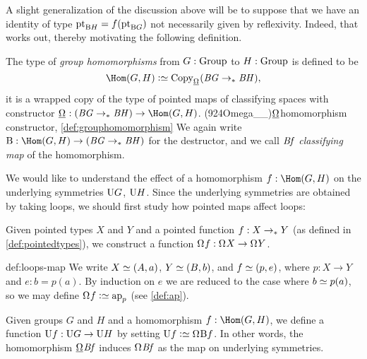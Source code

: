A slight generalization of the discussion above will be to suppose that we have an identity of type $\mathrm{pt}_{\mathrm{B} H} = f ( \mathrm{pt}_{\mathrm{B} G} ) $ not
necessarily given by reflexivity.  Indeed, that works out, thereby motivating the following definition.

\begin{definition}\label{def:grouphomomorphism}
  The type of \emph{group homomorphisms} from $G:\mathrm{Group}$ to
  $H:\mathrm{Group}$ is defined to be
  \[
    \Hom(G,H)\defequi\Copy_{\mkgroup}(\BG\ptdto\BH),
  \]
  \ie it is a wrapped copy of the type of pointed maps of classifying spaces
  with constructor
  $\mkhom : (\BG \ptdto \BH) \to \Hom(G,H)$.%
  \glossary(924Omega__){$\protect\mkhom$}{homomorphism constructor, \cref{def:grouphomomorphism}}
  We again write $\B : \Hom(G,H) \to (\BG \ptdto \BH)$ for the destructor,
  and we call $\mathit{B}\mathit{f}$ \emph{classifying map} of the homomorphism.
\end{definition}

We would like to understand the effect of a homomorphism $f : \Hom(G,H)$
on the underlying symmetries $\mathrm{U} G$, $\mathrm{U} H$.
Since the underlying symmetries are obtained by taking loops,
we should first study how pointed maps affect loops:

\begin{construction}\label{def:loops-map}
  Given pointed types $X$ and $Y$ and a pointed function $f : X\to_\ast Y$ (as defined in \cref{def:pointedtypes}),
  we construct a function $\loops f : \loops X \to \loops Y$.
\end{construction}

\begin{implementation}{def:loops-map}
  We write $X \jdeq (A,a)$, $Y \jdeq (B,b)$, and $f \jdeq (p,e)$, where $p : X \to Y$ and $e : b = p(a)$.
  By induction on $e$ we are reduced to the case where $b \jdeq p(a)$, so we may define $\loops f \defeq \ap p$
  (see \cref{def:ap}).
\end{implementation}

\begin{definition}\label{def:USym-hom}
  Given groups $G$ and $H$ and a homomorphism $f : \Hom(G,H)$, we define a function $\mathrm{U} f : \mathrm{U} G \to \mathrm{U} H$
  by setting $\USym f \defeq \loops \B f$.
  In other words, the homomorphism $\mkhom\Bf$
  induces $\loops\Bf$ as the map on underlying symmetries.
\end{definition}

